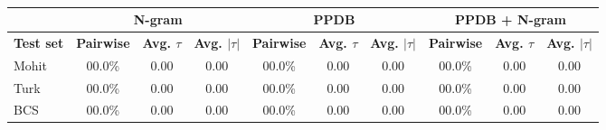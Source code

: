 \begin{table}
\small
\centering
\begin{tabular}{|l|ccc|ccc|ccc|}
	\hline 
	& \multicolumn{3}{c|}{N-gram} 
	& \multicolumn{3}{c|}{PPDB} 
	& \multicolumn{3}{c|}{PPDB + N-gram} \\
	\hline 
	\bf Test set
	& \bf Pairwise & \bf Avg. $\tau$ & \bf Avg. $|\tau|$ 
	& \bf Pairwise & \bf Avg. $\tau$ & \bf Avg. $|\tau|$ 
	& \bf Pairwise & \bf Avg. $\tau$ & \bf Avg. $|\tau|$ \\ 
	\hline
	Mohit & 00.0\%  & 0.00 & 0.00  & 00.0\% & 0.00 & 0.00 & 00.0\% & 0.00 & 0.00 \\ 
	Turk  & 00.0\%  & 0.00 & 0.00  & 00.0\% & 0.00 & 0.00 & 00.0\% & 0.00 & 0.00 \\
	BCS   & 00.0\%  & 0.00 & 0.00  & 00.0\% & 0.00 & 0.00 & 00.0\% & 0.00 & 0.00 \\
	\hline
\end{tabular}
\caption{\label{font-table} }
\end{table}




















